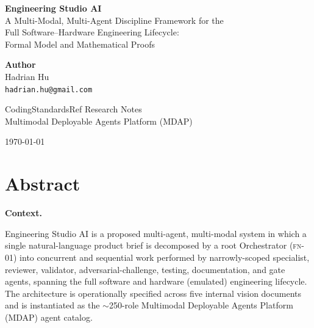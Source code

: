 \documentclass[12pt]{article}
\theoremstyle{definition}
\newcommand{\FN}[1]{\textsc{fn-#1}}
\begin{document}
\hypersetup{pageanchor=false}

\begin{titlepage}
    \centering
    \vspace*{1cm}
    {\LARGE \textbf{Engineering Studio AI}}\\[0.3cm]
    {\large A Multi-Modal, Multi-Agent Discipline Framework for the}\\
    {\large Full Software--Hardware Engineering Lifecycle:}\\
    {\large Formal Model and Mathematical Proofs}

    \vspace{2cm}

    {\large \textbf{Author}}\\
    Hadrian Hu\\
    \texttt{hadrian.hu@gmail.com}

    \vspace{1cm}

    {\large CodingStandardsRef Research Notes}\\
    Multimodal Deployable Agents Platform (MDAP)

    \vspace{2cm}

    {\large \today}

    \vfill
\end{titlepage}
\clearpage
\hypersetup{pageanchor=true}

\newpage
\section*{Abstract}

\noindent
\textbf{Context.}

Engineering Studio AI is a proposed multi-agent, multi-modal system
in which a single natural-language product brief is decomposed by a
root Orchestrator (\FN{01}) into concurrent and sequential work
performed by narrowly-scoped specialist, reviewer, validator,
adversarial-challenge, testing, documentation, and gate agents,
spanning the full software and hardware (emulated) engineering
lifecycle.
The architecture is operationally specified across five internal
vision documents and is instantiated as the $\sim$250-role
Multimodal Deployable Agents Platform (MDAP) agent catalog.
\end{document}
